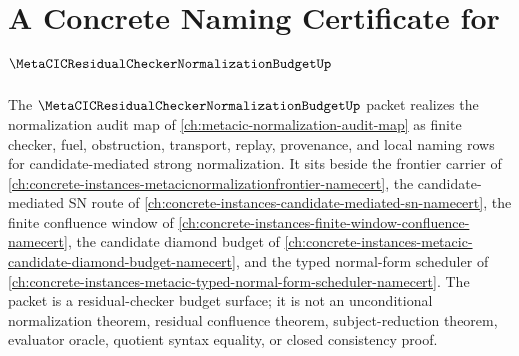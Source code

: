 \chapter{A Concrete Naming Certificate for $\MetaCICResidualCheckerNormalizationBudgetUp$}
\label{ch:concrete-instances-metacic-residual-checker-normalization-budget-namecert}

The $\MetaCICResidualCheckerNormalizationBudgetUp$ packet realizes the normalization audit map of \autoref{ch:metacic-normalization-audit-map} as finite checker, fuel, obstruction, transport, replay, provenance, and local naming rows for candidate-mediated strong normalization. It sits beside the frontier carrier of \autoref{ch:concrete-instances-metacicnormalizationfrontier-namecert}, the candidate-mediated SN route of \autoref{ch:concrete-instances-candidate-mediated-sn-namecert}, the finite confluence window of \autoref{ch:concrete-instances-finite-window-confluence-namecert}, the candidate diamond budget of \autoref{ch:concrete-instances-metacic-candidate-diamond-budget-namecert}, and the typed normal-form scheduler of \autoref{ch:concrete-instances-metacic-typed-normal-form-scheduler-namecert}. The packet is a residual-checker budget surface; it is not an unconditional normalization theorem, residual confluence theorem, subject-reduction theorem, evaluator oracle, quotient syntax equality, or closed consistency proof.

